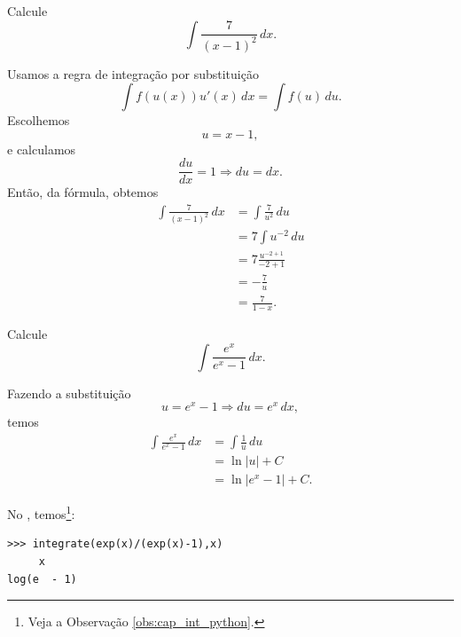 \begin{exeresol}
  Calcule
  \begin{equation}
    \int \frac{7}{(x-1)^2}\,dx.
  \end{equation}
\end{exeresol}
\begin{resol}
  Usamos a regra de integração por substituição
  \begin{equation}
    \int f(u(x))u'(x)\,dx = \int f(u)\,du.
  \end{equation}
  Escolhemos
  \begin{equation}
    u = x-1,
  \end{equation}
  e calculamos
  \begin{equation}
    \frac{du}{dx} = 1 \Rightarrow du = dx.
  \end{equation}
  Então, da fórmula, obtemos
  \begin{align}
    \int \frac{7}{(x-1)^2}\,dx &= \int \frac{7}{u^2}\,du\\
                               &= 7\int u^{-2}\,du\\
                               &= 7\frac{u^{-2+1}}{-2+1}\\
                               &= -\frac{7}{u}\\
                               &= \frac{7}{1-x}.
  \end{align}
\end{resol}

\begin{exeresol}
  Calcule
  \begin{equation}
    \int \frac{e^x}{e^x - 1}\,dx.
  \end{equation}
\end{exeresol}
\begin{resol}
  Fazendo a substituição
  \begin{equation}
    u = e^x-1 \Rightarrow du = e^x\,dx,
  \end{equation}
  temos
  \begin{align}
    \int \frac{e^x}{e^x - 1}\,dx &= \int \frac{1}{u}\,du \\
                                 &= \ln|u| + C \\
                                 &= \ln|e^x-1|+C.
  \end{align}

  \ifispython
No \sympy, temos\footnote{Veja a Observação \ref{obs:cap_int_python}.}:
\begin{verbatim}
>>> integrate(exp(x)/(exp(x)-1),x)
     x    
log(e  - 1)
\end{verbatim}
\fi      
\end{resol}


